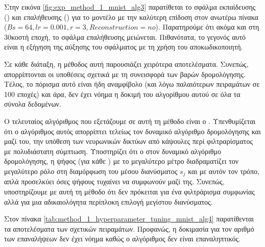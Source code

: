 Στην εικόνα \ref{fig:exp_method_1_mnist_alg3} παρατίθεται το σφάλμα εκπαίδευσης () και επαλήθευσης () για το μοντέλο με την καλύτερη επίδοση στον ανωτέρω πίνακα ($Bs = 64, lr = 0.001, r = 3, Reconstruction = no$). Παρατηρούμε ότι ακόμα και στη 30κοστή εποχή, το σφάλμα επαλήθευσης μειώνεται. Πιθανότατα, το γεγονός αυτό είναι η εξήγηση της αύξησης του σφάλματος με τη χρήση του αποκωδικοποιητή.\par

Σε κάθε διάταξη, η μέθοδος αυτή παρουσιάζει χειρότερα αποτελέσματα. Συνεπώς, απορρίπτονται οι υποθέσεις σχετικά με τη συνεισφορά των βαρών δρομολόγησης. Τέλος, το πόρισμα αυτό είναι ήδη αναμφίβολο (και λόγω παλαιότερων πειραμάτων σε 100 εποχές) και άρα, δεν έχει νόημα η δοκιμή του αλγορίθμου αυτού σε όλα τα σύνολα δεδομένων.\par

Ο τελευταίος αλγόριθμος που εξετάζουμε σε αυτή τη μέθοδο είναι ο . Υπενθυμίζεται ότι ο αλγόριθμος αυτός απορρίπτει τελείως τον δυναμικό αλγόριθμο δρομολόγησης και μαζί του, την υπόθεση των νευρωνικών δικτύων από κάψουλες περί φιλτραρίσματος με πολυδιάστατη σύμπτωση. Υποστηρίζει ότι ο στον δυναμικό αλγόριθμο δρομολόγησης, η ψήφος (για κάθε ) με το μεγαλύτερο μέτρο διαδραματίζει τον μεγαλύτερο ρόλο στη διαμόρφωση του μέσου διανύσματος $s_j$ και με αυτόν τον τρόπο, απλά προσελκύει όσες ψήφους τυχαίνει να συμφωνούν μαζί της. Συνεπώς, υποστηρίζουμε με αυτή τη μέθοδο ότι δεν πρόκειται για ένα φιλτράρισμα συμφωνίας αλλά για μια αδικαιολόγητα περίπλοκη επιλογή μεγίστου διανύσματος.\par

Στον πίνακα \ref{tab:method_1_hyperparameter_tuning_mnist_alg4} παρατίθενται τα αποτελέσματα των σχετικών πειραμάτων. Προφανώς, η δοκιμασία για τον αριθμό των επαναλήψεων δεν έχει νόημα καθώς ο αλγόριθμος δεν είναι επαναληπτικός.

